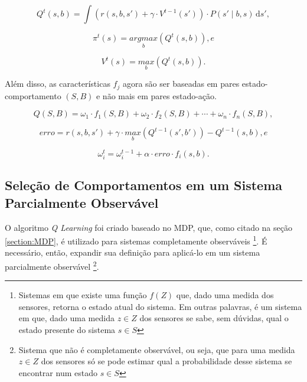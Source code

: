 \begin{equation} \label{equation:QValueFunctionBehavior}
    Q^t \left( s, b \right) = \int \! \left( r \left( s, b, s' \right) + \gamma \cdot V^{t-1} \left( s' \right) \right) \cdot P \left( s' \mid b, s \right) \, \mathrm{d}s',
\end{equation}

\begin{equation} \label{equation:PolicySelectionBehavior}
    \pi^t \left( s \right) = \underset{b}{argmax} \left( Q^t \left( s, b \right) \right), e
\end{equation}

\begin{equation}
    V^t \left( s \right) = \underset{b}{max} \left( Q^t \left( s, b \right) \right).
\end{equation}

Além disso, as características $ f_j $ agora são ser baseadas em pares estado-comportamento $ \left( S, B \right) $ e não mais em pares estado-ação.

\begin{equation}
	Q \left( S, B \right) = \omega_1 \cdot f_1 \left( S, B \right) + \omega_2 \cdot f_2 \left( S, B \right) + \cdots + \omega_n \cdot f_n \left( S, B \right),
\end{equation}

\begin{equation} \label{equation:QErrorBehavior}
	erro = r \left( s, b, s' \right) + \gamma \cdot \underset{b}{max} \left( Q^{t-1} \left( s', b' \right) \right) - Q^{t-1} \left( s, b \right), e
\end{equation}

\begin{equation} \label{equation:OmegaUpdateBehavior}
	\omega_i^t = \omega_i^{t-1} + \alpha \cdot erro \cdot f_i \left( s, b \right).
\end{equation}


\subsection{Seleção de Comportamentos em um Sistema Parcialmente Observável} \label{subsection:QLearningParcialmenteObservavel}

O algoritmo \textit{Q Learning} foi criado baseado no MDP, que, como citado na seção \ref{section:MDP}, é utilizado para sistemas completamente observáveis%
\footnote{Sistemas em que existe uma função $ f \left( Z \right) $ que, dado uma medida dos sensores, retorna o estado atual do sistema. Em outras palavras, é um sistema em que, dado uma medida $ z \in Z $ dos sensores se sabe, sem dúvidas, qual o estado presente do sistema $ s \in S $%
}. É necessário, então, expandir sua definição para aplicá-lo em um sistema parcialmente observável%
\footnote{Sistema que não é completamente observável, ou seja, que para uma medida $ z \in Z $ dos sensores só se pode estimar qual a probabilidade desse sistema se encontrar num estado $ s \in S $%
}.

